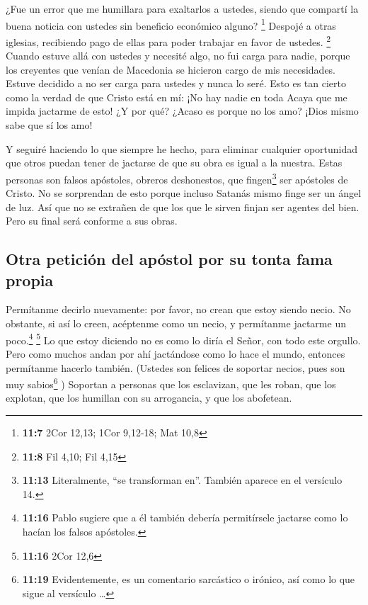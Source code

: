  ¿Fue un error que me humillara para exaltarlos a ustedes,
siendo que compartí la buena noticia con ustedes sin beneficio económico
alguno? \footnote{\textbf{11:7} 2Cor 12,13; 1Cor 9,12-18; Mat 10,8}
 Despojé a otras iglesias, recibiendo pago de ellas para
poder trabajar en favor de ustedes. \footnote{\textbf{11:8} Fil 4,10;
  Fil 4,15}  Cuando estuve allá con ustedes y necesité
algo, no fui carga para nadie, porque los creyentes que venían de
Macedonia se hicieron cargo de mis necesidades. Estuve decidido a no ser
carga para ustedes y nunca lo seré.  Esto es tan cierto
como la verdad de que Cristo está en mí: ¡No hay nadie en toda Acaya que
me impida jactarme de esto!  ¿Y por qué? ¿Acaso es porque
no los amo? ¡Dios mismo sabe que sí los amo!

 Y seguiré haciendo lo que siempre he hecho, para
eliminar cualquier oportunidad que otros puedan tener de jactarse de que
su obra es igual a la nuestra.  Estas personas son falsos
apóstoles, obreros deshonestos, que fingen\footnote{\textbf{11:13}
  Literalmente, ``se transforman en''. También aparece en el versículo
  14.} ser apóstoles de Cristo.  No se sorprendan de esto
porque incluso Satanás mismo finge ser un ángel de luz. 
Así que no se extrañen de que los que le sirven finjan ser agentes del
bien. Pero su final será conforme a sus obras.

\hypertarget{otra-peticiuxf3n-del-apuxf3stol-por-su-tonta-fama-propia}{%
\subsection{Otra petición del apóstol por su tonta fama
propia}\label{otra-peticiuxf3n-del-apuxf3stol-por-su-tonta-fama-propia}}

 Permítanme decirlo nuevamente: por favor, no crean que
estoy siendo necio. No obstante, si así lo creen, acéptenme como un
necio, y permítanme jactarme un poco.\footnote{\textbf{11:16} Pablo
  sugiere que a él también debería permitírsele jactarse como lo hacían
  los falsos apóstoles.} \footnote{\textbf{11:16} 2Cor 12,6}
 Lo que estoy diciendo no es como lo diría el Señor, con
todo este orgullo.  Pero como muchos andan por ahí
jactándose como lo hace el mundo, entonces permítanme hacerlo también.
 (Ustedes son felices de soportar necios, pues son muy
sabios\footnote{\textbf{11:19} Evidentemente, es un comentario
  sarcástico o irónico, así como lo que sigue al versículo \ldots{}} )
 Soportan a personas que los esclavizan, que les roban,
que los explotan, que los humillan con su arrogancia, y que los
abofetean.

